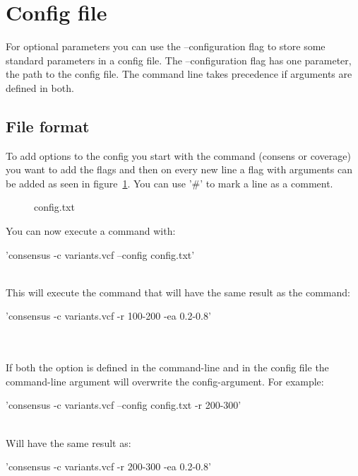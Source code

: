 \section{Config file}
For optional parameters you can use the --configuration flag to store some standard parameters in a config file. The --configuration flag has one parameter, the path to the config file.
The command line takes precedence if arguments are defined in both.

\subsection{File format}
To add options to the config you start with the command (consens or coverage) you want to add the flags and then on every new line a flag with arguments can be added as seen in figure~\ref{fig:config-file}. You can use '\#' to mark a line as a comment.
\\
\begin{figure}[h]
\caption{config.txt}
\label{fig:config-file}
\end{figure}

You can now execute a command with: \\
\begin{markdown}
'consensus -c variants.vcf --config config.txt'
\end{markdown}
\\
This will execute the command that will have the same result as the command:
\\
\begin{markdown}
'consensus -c variants.vcf -r 100-200 -ea 0.2-0.8'
\end{markdown}
\\
\\
If both the option is defined in the command-line and in the config file the command-line argument will overwrite the config-argument. For example:\\ 
\begin{markdown}
'consensus -c variants.vcf --config config.txt -r 200-300'
\end{markdown}
\\
Will have the same result as:
\\
\begin{markdown}
'consensus -c variants.vcf -r 200-300 -ea 0.2-0.8'
\end{markdown}